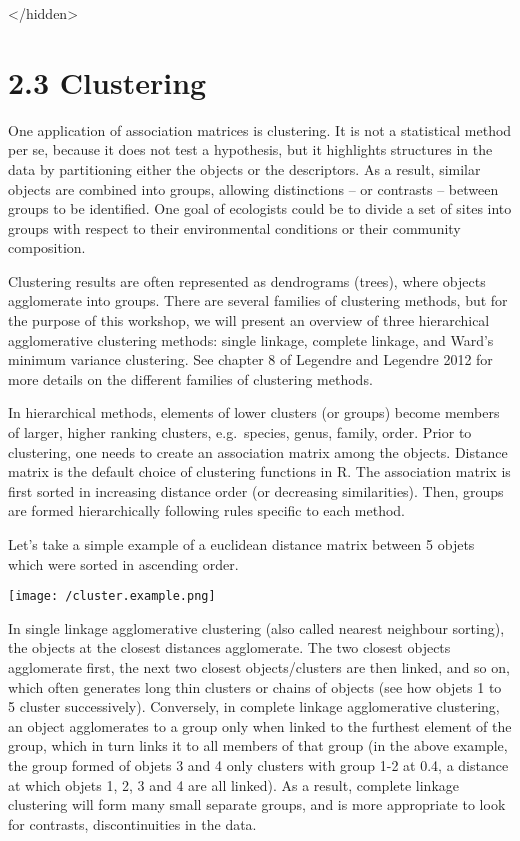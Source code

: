 \documentclass[
]{book}
\begin{document}
\textless/hidden\textgreater{}

\hypertarget{clustering}{%
\section{2.3 Clustering}\label{clustering}}

One application of association matrices is clustering. It is not a
statistical method per se, because it does not test a hypothesis, but it
highlights structures in the data by partitioning either the objects or
the descriptors. As a result, similar objects are combined into groups,
allowing distinctions -- or contrasts -- between groups to be
identified. One goal of ecologists could be to divide a set of sites
into groups with respect to their environmental conditions or their
community composition.

Clustering results are often represented as dendrograms (trees), where
objects agglomerate into groups. There are several families of
clustering methods, but for the purpose of this workshop, we will
present an overview of three hierarchical agglomerative clustering
methods: single linkage, complete linkage, and Ward's minimum variance
clustering. See chapter 8 of Legendre and Legendre 2012 for more details
on the different families of clustering methods.

In hierarchical methods, elements of lower clusters (or groups) become
members of larger, higher ranking clusters, e.g.~species, genus, family,
order. Prior to clustering, one needs to create an association matrix
among the objects. Distance matrix is the default choice of clustering
functions in R. The association matrix is first sorted in increasing
distance order (or decreasing similarities). Then, groups are formed
hierarchically following rules specific to each method.

Let's take a simple example of a euclidean distance matrix between 5
objets which were sorted in ascending order.

\texttt{[image: /cluster.example.png]}

In single linkage agglomerative clustering (also called nearest
neighbour sorting), the objects at the closest distances agglomerate.
The two closest objects agglomerate first, the next two closest
objects/clusters are then linked, and so on, which often generates long
thin clusters or chains of objects (see how objets 1 to 5 cluster
successively). Conversely, in complete linkage agglomerative clustering,
an object agglomerates to a group only when linked to the furthest
element of the group, which in turn links it to all members of that
group (in the above example, the group formed of objets 3 and 4 only
clusters with group 1-2 at 0.4, a distance at which objets 1, 2, 3 and 4
are all linked). As a result, complete linkage clustering will form many
small separate groups, and is more appropriate to look for contrasts,
discontinuities in the data.
\end{document}
